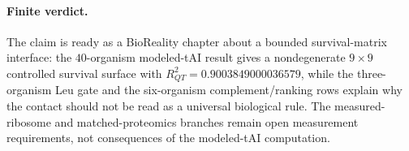\paragraph{Finite verdict.}
The claim is ready as a BioReality chapter about a bounded survival-matrix interface: the $40$-organism modeled-tAI result gives a nondegenerate $9\times 9$ controlled survival surface with $R^2_{QT}=0.9003849000036579$, while the three-organism Leu gate and the six-organism complement/ranking rows explain why the contact should not be read as a universal biological rule.  The measured-ribosome and matched-proteomics branches remain open measurement requirements, not consequences of the modeled-tAI computation.

